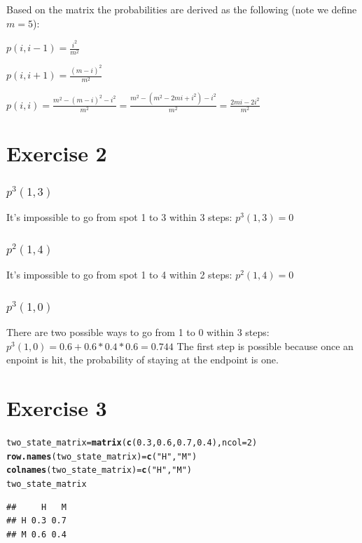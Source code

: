 \documentclass{article}\usepackage[]{graphicx}\usepackage[]{color}
\makeatletter
\newcommand{\hlnum}[1]{\textcolor[rgb]{0.686,0.059,0.569}{#1}}%
\newcommand{\hlstr}[1]{\textcolor[rgb]{0.192,0.494,0.8}{#1}}%
\newcommand{\hlstd}[1]{\textcolor[rgb]{0.345,0.345,0.345}{#1}}%
\newcommand{\hlkwb}[1]{\textcolor[rgb]{0.69,0.353,0.396}{#1}}%
\newcommand{\hlkwc}[1]{\textcolor[rgb]{0.333,0.667,0.333}{#1}}%
\newcommand{\hlkwd}[1]{\textcolor[rgb]{0.737,0.353,0.396}{\textbf{#1}}}%
\newenvironment{kframe}{%
 \def\at@end@of@kframe{}%
 \ifinner\ifhmode%
  \def\at@end@of@kframe{\end{minipage}}%
  \begin{minipage}{\columnwidth}%
 \fi\fi%
 \def\FrameCommand##1{\hskip\@totalleftmargin \hskip-\fboxsep
 \colorbox{shadecolor}{##1}\hskip-\fboxsep
     \hskip-\linewidth \hskip-\@totalleftmargin \hskip\columnwidth}%
 \MakeFramed {\advance\hsize-\width
   \@totalleftmargin\z@ \linewidth\hsize
   \@setminipage}}%
 {\par\unskip\endMakeFramed%
 \at@end@of@kframe}
\newenvironment{knitrout}{}{} %
\makeatother
\begin{document}
Based on the matrix the probabilities are derived as the following (note we define $m=5$):

$p(i, i-1)=\frac{i^{2}}{m^{2}}$

$p(i,i+1)=\frac{(m-i)^{2}}{m^{2}}$

$p(i,i)=\frac{m^{2}-(m-i)^{2}-i^2}{m^2}=\frac{m^{2}-(m^2-2mi+i^2)-i^2}{m^2}=\frac{2mi-2i^{2}}{m^{2}}$

\section*{Exercise 2}
\subsubsection*{$p^{3}(1,3)$}
It's impossible to go from spot 1 to 3 within 3 steps: $p^{3}(1,3) = 0$

\subsubsection*{$p^{2}(1,4)$}
It's impossible to go from spot 1 to 4 within 2 steps: $p^{2}(1,4) = 0$

\subsubsection*{$p^3(1,0)$}
There are two possible ways to go from 1 to 0 within 3 steps: $p^3(1,0) = 0.6 + 0.6*0.4*0.6 = 0.744$
The first step is possible because once an enpoint is hit, the probability of staying at the endpoint is one.

\section*{Exercise 3}
\begin{knitrout}
\color{fgcolor}\begin{kframe}
\begin{alltt}
\hlstd{two_state_matrix} \hlkwb{=} \hlkwd{matrix}\hlstd{(}\hlkwd{c}\hlstd{(}\hlnum{0.3}\hlstd{,}\hlnum{0.6}\hlstd{,}\hlnum{0.7}\hlstd{,}\hlnum{0.4}\hlstd{),} \hlkwc{ncol} \hlstd{=} \hlnum{2}\hlstd{)}
\hlkwd{row.names}\hlstd{(two_state_matrix)} \hlkwb{=} \hlkwd{c}\hlstd{(}\hlstr{"H"}\hlstd{,} \hlstr{"M"}\hlstd{)}
\hlkwd{colnames}\hlstd{(two_state_matrix)} \hlkwb{=} \hlkwd{c}\hlstd{(}\hlstr{"H"}\hlstd{,} \hlstr{"M"}\hlstd{)}
\hlstd{two_state_matrix}
\end{alltt}
\begin{verbatim}
##     H   M
## H 0.3 0.7
## M 0.6 0.4
\end{verbatim}
\end{kframe}
\end{knitrout}
\end{document}
